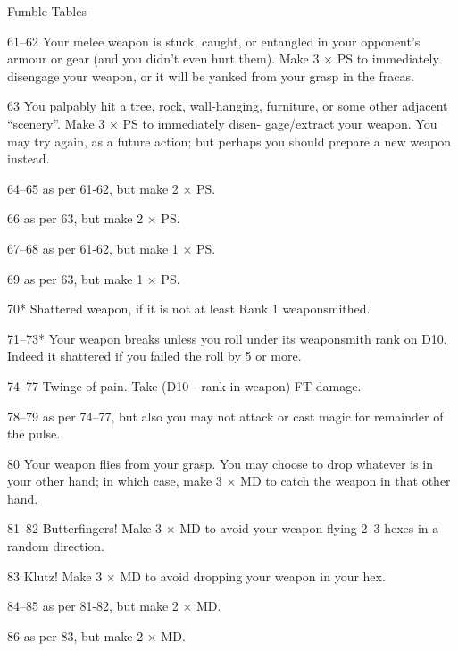 \begin{Chapter}{Fumble Tables}
\begin{Description}
\item[61–62] Your melee weapon is stuck, caught, or entangled in your
  opponent’s armour or gear (and you didn’t even hurt them). Make 3 ×
  PS to immediately disengage your weapon, or it will be yanked from
  your grasp in the fracas.

63   You palpably hit a tree, rock, wall-hanging, 
furniture, or some other adjacent “scenery”. 
Make 3 × PS to immediately disen-
gage/extract your weapon. You may try 
again, as a future action; but perhaps you 
should prepare a new weapon instead. 

\item[64–65] as per 61-62, but make 2 × PS.

\item[66] as per 63, but make 2 × PS.

\item[67–68] as per 61-62, but make 1 × PS.

\item[69] as per 63, but make 1 × PS.

\item[70*]   Shattered weapon, if it is not at least Rank 1 
weaponsmithed. 

\item[71–73*] Your weapon breaks unless you roll under its weaponsmith
  rank on D10. Indeed it shattered if you failed the roll by 5 or
  more.

\item[74–77] Twinge of pain. Take (D10 - rank in weapon) FT damage.

\item[78–79] as per 74–77, but also you may not attack or cast magic
  for remainder of the pulse.

\item[80] Your weapon flies from your grasp. You may choose to drop
  whatever is in your other hand; in which case, make 3 × MD to catch
  the weapon in that other hand.

\item[81–82] Butterfingers! Make 3 × MD to avoid your weapon flying
  2–3 hexes in a random direction.

\item[83] Klutz! Make 3 × MD to avoid dropping your weapon in your
  hex.

\item[84–85] as per 81-82, but make 2 × MD.

\item[86] as per 83, but make 2 × MD.


\end{Description}
\end{Chapter}
